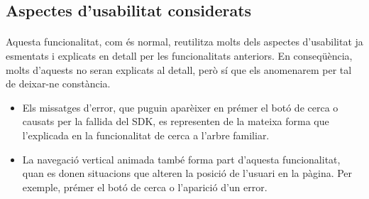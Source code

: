\subsection{Aspectes d'usabilitat considerats}

    \paragraph{}
    Aquesta funcionalitat, com és normal, reutilitza molts dels aspectes d'usabilitat ja esmentats i explicats en detall per les funcionalitats anteriors. En conseqüència, molts d'aquests no seran explicats al detall, però sí que els anomenarem per tal de deixar-ne constància.

    \begin{itemize}
        \item Els missatges d'error, que puguin aparèixer en prémer el botó de cerca o causats per la fallida del SDK, es representen de la mateixa forma que l’explicada en la funcionalitat de cerca a l’arbre familiar.
        \item La navegació vertical animada també forma part d'aquesta funcionalitat, quan es donen situacions que alteren la posició de l’usuari en la pàgina. Per exemple, prémer el botó de cerca o l'aparició d'un error.
    \end{itemize}

    
    
    
